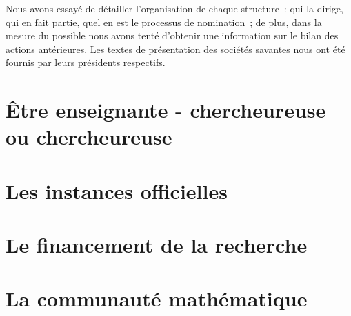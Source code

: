 \documentclass[11pt]{book}
\renewcommand*{\mp}{\textperiodcentered}
\begin{document}
Nous avons essay\'e de d\'etailler l'organisation de chaque structure~:
qui la dirige, qui en fait partie, quel en est le processus de
nomination~; de plus, dans la mesure du possible nous avons tent\'e
d'obtenir une information sur le bilan des actions ant\'erieures.
Les textes de pr\'e\-sen\-ta\-tion des
soci\'et\'es savantes nous ont \'et\'e
fournis par leurs pr\'esidents respectifs.




\part{\^Etre enseignant\mp e - chercheur\mp euse ou chercheur\mp euse}








\part{Les instances officielles}


 







\part{Le financement de la recherche}




\part{La communaut\'e math\'ematique}








\printindex
\end{document}
